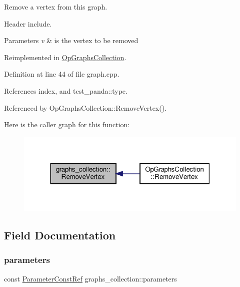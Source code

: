 Remove a vertex from this graph. 

Header include.


\begin{DoxyParams}{Parameters}
{\em v} & is the vertex to be removed \\
\hline
\end{DoxyParams}


Reimplemented in \hyperlink{classOpGraphsCollection_afb2e5e89d55bac25193625245b7de2fd}{Op\+Graphs\+Collection}.



Definition at line 44 of file graph.\+cpp.



References index, and test\+\_\+panda\+::type.



Referenced by Op\+Graphs\+Collection\+::\+Remove\+Vertex().

Here is the caller graph for this function\+:
\nopagebreak
\begin{figure}[H]
\begin{center}
\leavevmode
\includegraphics[width=318pt]{d8/d8d/structgraphs__collection_abf3690c3dab1f860b7b0a520b59d0e01_icgraph}
\end{center}
\end{figure}


\subsection{Field Documentation}
\mbox{\label{structgraphs__collection_adfc2ecaf0a04245a3cfd572c213ef1ed}} 
\subsubsection{\texorpdfstring{parameters}{parameters}}
{\footnotesize\ttfamily const \hyperlink{Parameter_8hpp_a37841774a6fcb479b597fdf8955eb4ea}{Parameter\+Const\+Ref} graphs\+\_\+collection\+::parameters}



